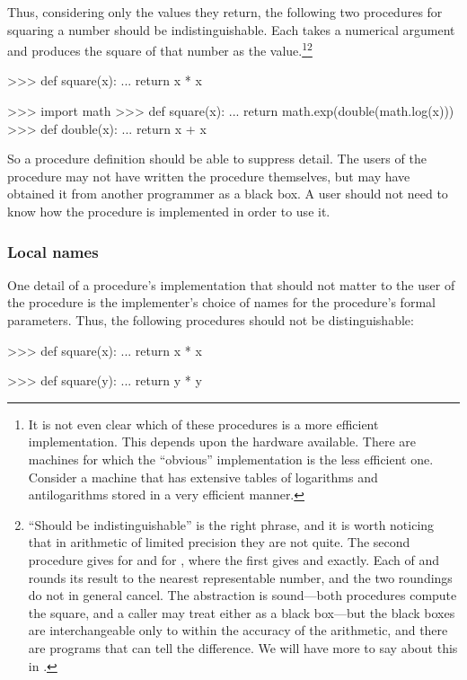Thus, considering only the values they return, the following two procedures for
squaring a number should be indistinguishable.  Each takes a numerical argument
and produces the square of that number as the value.\footnote{It is not even
clear which of these procedures is a more efficient implementation.  This
depends upon the hardware available.  There are machines for which the
``obvious'' implementation is the less efficient one.  Consider a machine that
has extensive tables of logarithms and antilogarithms stored in a very efficient
manner.}\footnote{``Should be indistinguishable'' is the right phrase, and it is
worth noticing that in arithmetic of limited precision they are not quite.  The
second procedure gives  for  and
 for , where the first gives 
and  exactly.  Each of  and  rounds its result to
the nearest representable number, and the two roundings do not in general
cancel.  The abstraction is sound---both procedures compute the square, and a
caller may treat either as a black box---but the black boxes are
interchangeable only to within the accuracy of the arithmetic, and there are
programs that can tell the difference.  We will have more to say about this in
.}

\begin{codeBlock}
>>> def square(x):
...     return x * x

>>> import math
>>> def square(x):
...     return math.exp(double(math.log(x)))
>>> def double(x):
...     return x + x
\end{codeBlock}

\noindent
So a procedure definition should be able to suppress detail.  The users of the
procedure may not have written the procedure themselves, but may have obtained
it from another programmer as a black box.  A user should not need to know how
the procedure is implemented in order to use it.

\subsubsection*{Local names}

One detail of a procedure's implementation that should not matter to the user of
the procedure is the implementer's choice of names for the procedure's formal
parameters.  Thus, the following procedures should not be distinguishable:

\begin{codeBlock}
>>> def square(x):
...     return x * x

>>> def square(y):
...     return y * y
\end{codeBlock}

